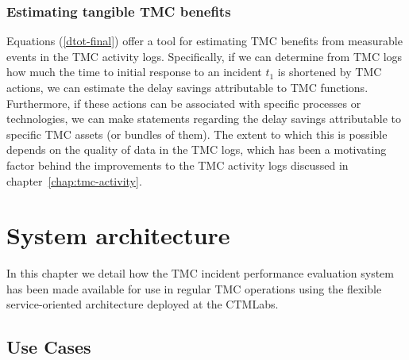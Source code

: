 \documentclass[12pt]{report}
\renewcommand{\fixme}[3][]{#1\xspace}
\newcounter{time}
\newcounter{space}
\begin{document}
\subsection{Estimating tangible TMC benefits}
\label{sec:est-benefits}

Equations (\ref{dtot-final}) offer a tool for estimating \ac{TMC} benefits from
measurable events in the \ac{TMC} activity logs.  Specifically, if we can
determine from \ac{TMC} logs how much the time to initial response to an
incident $t_1$ is shortened by \ac{TMC} actions, we can estimate the delay
savings attributable to \ac{TMC} functions.  Furthermore, if these actions can
be associated with specific processes or technologies, we can make statements
regarding the delay savings attributable to specific \ac{TMC} assets (or bundles
of them). The extent to which this is possible depends on the quality of data in
the \ac{TMC} logs, which has been a motivating factor behind the improvements to
the \ac{TMC} activity logs discussed in chapter~\ref{chap:tmc-activity}.






\chapter{System architecture}
\label{sec:system-architecture}


In this chapter we detail how the \ac{TMC} incident performance evaluation
system has been made available for use in regular \ac{TMC} operations using the
flexible service-oriented architecture deployed at the \ac{CTMLabs}.

\section{Use Cases}
\label{sec:use-cases}
\end{document}
